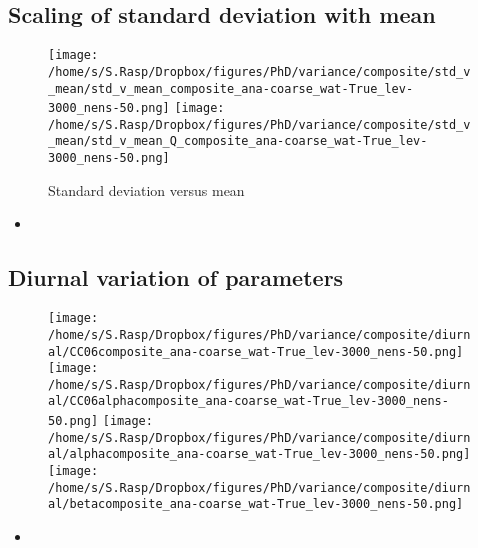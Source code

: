 \documentclass[a4paper, 12pt]{article}
\begin{document}
\subsection{Scaling of standard deviation with mean}
\begin{figure}[h!]
\noindent \centering
\texttt{[image: /home/s/S.Rasp/Dropbox/figures/PhD/variance/composite/std\_v\_mean/std\_v\_mean\_composite\_ana-coarse\_wat-True\_lev-3000\_nens-50.png]}
\texttt{[image: /home/s/S.Rasp/Dropbox/figures/PhD/variance/composite/std\_v\_mean/std\_v\_mean\_Q\_composite\_ana-coarse\_wat-True\_lev-3000\_nens-50.png]}\\
\caption{Standard deviation versus mean} \label{fig:geographical}
\end{figure}
\begin{itemize}
 \item 
\end{itemize}

\newpage

\subsection{Diurnal variation of parameters}
\begin{figure}[h!]
\noindent \centering
\texttt{[image: /home/s/S.Rasp/Dropbox/figures/PhD/variance/composite/diurnal/CC06composite\_ana-coarse\_wat-True\_lev-3000\_nens-50.png]}
\texttt{[image: /home/s/S.Rasp/Dropbox/figures/PhD/variance/composite/diurnal/CC06alphacomposite\_ana-coarse\_wat-True\_lev-3000\_nens-50.png]}
\texttt{[image: /home/s/S.Rasp/Dropbox/figures/PhD/variance/composite/diurnal/alphacomposite\_ana-coarse\_wat-True\_lev-3000\_nens-50.png]}
\texttt{[image: /home/s/S.Rasp/Dropbox/figures/PhD/variance/composite/diurnal/betacomposite\_ana-coarse\_wat-True\_lev-3000\_nens-50.png]}\\
\caption{} \label{fig:geographical}
\end{figure}
\begin{itemize}
 \item 
\end{itemize}

\newpage


\end{document}
